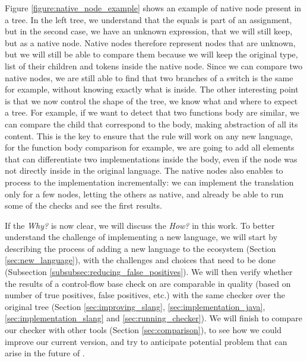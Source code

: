Figure \ref{figure:native_node_example} shows an example of native node present in a \slang{} tree. In the left tree, we understand that the equals is part of an assignment, but in the second case, we have an unknown expression, that we will still keep, but as a native node.
Native nodes therefore represent nodes that are unknown, but we will still be able to compare them because we will keep the original type, list of their children and tokens inside the native node. 
Since we can compare two native nodes, we are still able to find that two branches of a switch is the same for example, without knowing exactly what is inside. 
The other interesting point is that we now control the shape of the tree, we know what and where to expect a tree. 
For example, if we want to detect that two functions body are similar, we can compare the child that correspond to the body, making abstraction of all its content.
This is the key to ensure that the rule will work on any new language, for the function body comparison for example, we are going to add all elements that can differentiate two implementations inside the body, even if the node was not directly inside in the original language.
The native nodes also enables to process to the implementation incrementally: we can implement the translation only for a few nodes, letting the others as native, and already be able to run some of the checks and see the first results.


If the \emph{Why?} is now clear, we will discuss the \emph{How?} in this work. 
To better understand the challenge of implementing a new language, we will start by describing the process of adding a new language to the ecosystem (Section \ref{sec:new_language}), with the challenges and choices that need to be done (Subsection \ref{subsubsec:reducing_false_positives}). 
We will then verify whether the results of a control-flow base check on \slang{} are comparable in quality (based on number of true positives, false positives, etc.) with the same checker over the original tree (Section \ref{sec:improving_slang}, \ref{sec:implementation_java}, \ref{sec:implementation_slang} and \ref{sec:running_checker}).
We will finish to compare our checker with other tools (Section \ref{sec:comparison}), to see how we could improve our current version, and try to anticipate potential problem that can arise in the future of \slang{}.




